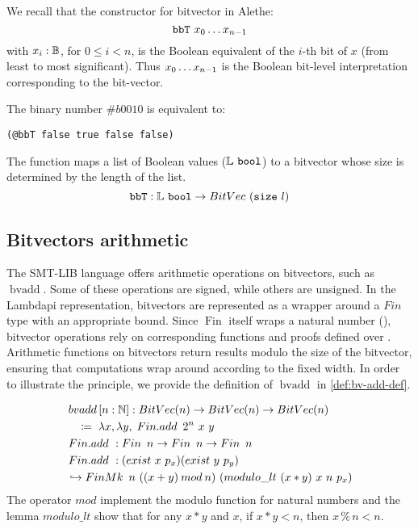 We recall that the constructor for bitvector in Alethe: $$\mathtt{bbT}\ \enum[n-1]{x}[][0]$$ with $x_i: \mathbb{B}$, for $0\leq i< n$,
is the Boolean equivalent of the $i$-th bit of $x$ (from least to most significant). Thus $\enum[n-1]{x}[][0]$ is the Boolean bit-level interpretation corresponding to the bit-vector.

\begin{example}
The binary number $\#b0010$ is equivalent to:

\begin{lstlisting}[language=SMT]
(@bbT false true false false)
\end{lstlisting}
\end{example}

\begin{definition}
The function  maps a list of Boolean values ($\mathbb{L}~\texttt{\upshape{bool}}$) to a bitvector whose size is determined by the length of the list.
\begin{equation*}
\texttt{\upshape{bbT}} : \mathbb{L}~\texttt{\upshape{bool}} \rightarrow BitVec~(\texttt{\upshape{size}}~l)
\end{equation*}
\end{definition}

\subsection{Bitvectors arithmetic}

The SMT-LIB language offers arithmetic operations on bitvectors, such as $\mathop{bvadd}$.
Some of these operations are signed, while others are unsigned. In the Lambdapi representation, bitvectors are represented as a wrapper around a $Fin$ type with an appropriate bound.
Since $\mathop{Fin}$ itself wraps a natural number (\N), bitvector operations rely on corresponding functions and proofs defined over \N.
Arithmetic functions on bitvectors return results modulo the size of the bitvector, ensuring that computations wrap around according to the fixed width.
In order to illustrate the principle, we provide the definition of $\mathop{bvadd}$ in \cref{def:bv-add-def}.

\begin{definition}\label{def:bv-add-def}
\begin{align*}
&\mathop{bvadd}\,[n : \mathbb{N}] : \mathop{BitVec}(n) \rightarrow \mathop{BitVec}(n) \rightarrow \mathop{BitVec}(n) \\
&\quad\coloneq\; \lambda x, \lambda y, \; \mathop{Fin.add}~2^n~x~y \\
&\mathop{Fin.add}~: \mathop{Fin}~n \rightarrow \mathop{Fin}~n \rightarrow \mathop{Fin}~n \\
&\mathop{Fin.add}~: (\mathbin{exist}~x~p_x) (\mathbin{exist}~y~p_y) \\
&\hookrightarrow \mathop{FinMk}~n~((x + y) \mathbin{mod} n)~(modulo\_lt~(x * y)~x~n~p_x)
\end{align*}
The operator $\mathbin{mod}$ implement the modulo function for natural numbers and the lemma $modulo\_lt$
show that for any $x * y$ and $x$, if $x * y < n$, then $x \mathbin{\%} n < n$.
\end{definition}


